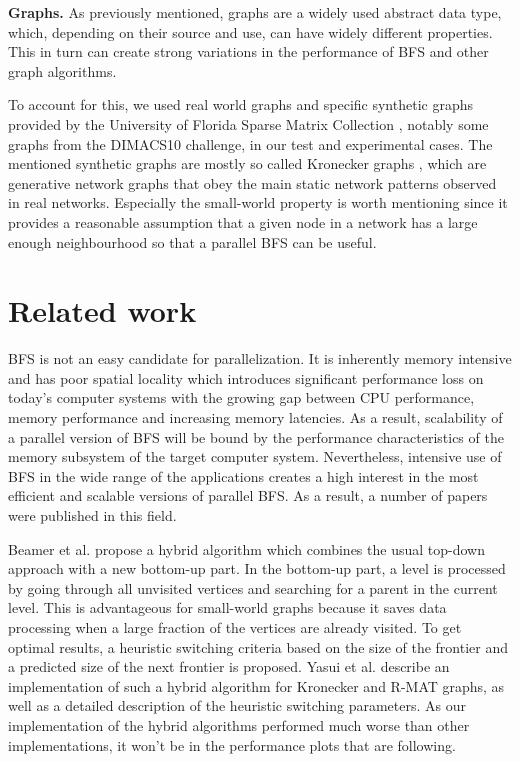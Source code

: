 \documentclass[letterpaper]{article}
\newcommand{\mypar}[1]{{\bf #1.}} %
\begin{document}
	
	\mypar{Graphs}
	As previously mentioned, graphs are a widely used abstract data type, which, depending on their source and use, can have widely different properties.
	This in turn can create strong variations in the performance of BFS and other graph algorithms.
	
	To account for this, we used real world graphs and specific synthetic graphs provided by the University of Florida Sparse Matrix Collection \cite{SparseMatrixCollection}, notably some graphs from the DIMACS10 challenge, in our test and experimental cases.
	The mentioned synthetic graphs are mostly so called Kronecker graphs \cite{Leskovec:2010:KGA:1756006.1756039}, which are generative network graphs that obey the main static network patterns observed in real networks.
	Especially the small-world property is worth mentioning since it provides a reasonable assumption that a given node in a network has a large enough neighbourhood so that a parallel BFS can be useful.	
	


	\section{Related work} \label{sec:rewo} %
		BFS is not an easy candidate for parallelization.
		It is inherently memory intensive and has poor spatial locality which introduces significant performance loss on today's computer systems with the growing gap between CPU performance, memory performance and increasing memory latencies.
		As a result, scalability of a parallel version of BFS will be bound by the performance characteristics of the memory subsystem of the target computer system. 
		Nevertheless, intensive use of BFS in the wide range of the applications creates a high interest in the most efficient and scalable versions of parallel BFS.
		As a result, a number of papers were published in this field. 
		
		Beamer et al.\cite{beamer2011searching} propose a hybrid algorithm which combines the usual top-down approach with a new bottom-up part. 
		In the bottom-up part, a level is processed by going through all unvisited vertices and searching for a parent in the current level. 
		This is advantageous for small-world graphs because it saves data processing when a large fraction of the vertices are already visited. 
		To get optimal results, a heuristic switching criteria based  on the size of the frontier and a predicted size of the next frontier is proposed. 
		Yasui et al.\cite{6691600} describe an implementation of such a hybrid algorithm for Kronecker and R-MAT graphs, as well as a detailed description of the heuristic switching parameters.
		As our implementation of the hybrid algorithms performed much worse than other implementations, it won't be in the performance plots that are following.
	
\end{document}
